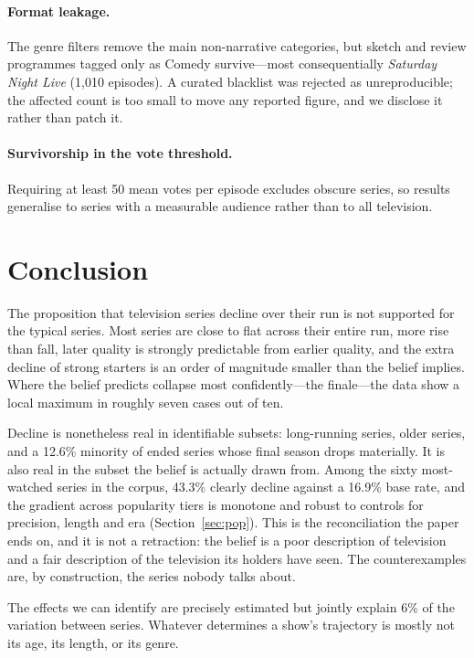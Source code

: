 \documentclass[11pt,a4paper]{article}
\begin{document}
\paragraph{Format leakage.}
The genre filters remove the main non-narrative categories, but sketch and
review programmes tagged only as Comedy survive---most consequentially
\emph{Saturday Night Live} (1,010 episodes). A curated blacklist was rejected
as unreproducible; the affected count is too small to move any reported figure,
and we disclose it rather than patch it.

\paragraph{Survivorship in the vote threshold.}
Requiring at least 50 mean votes per episode excludes obscure series, so
results generalise to series with a measurable audience rather than to all
television.

\FloatBarrier
\section{Conclusion}

The proposition that television series decline over their run is not supported
for the typical series. Most series are close to flat across their entire run,
more rise than fall, later quality is strongly predictable from earlier
quality, and the extra decline of strong starters is an order of magnitude
smaller than the belief implies. Where the belief predicts collapse most
confidently---the finale---the data show a local maximum in roughly seven cases
out of ten.

Decline is nonetheless real in identifiable subsets: long-running series, older
series, and a 12.6\% minority of ended series whose final season drops
materially. It is also real in the subset the belief is actually drawn from.
Among the sixty most-watched series in the corpus, 43.3\% clearly decline
against a 16.9\% base rate, and the gradient across popularity tiers is monotone
and robust to controls for precision, length and era
(Section~\ref{sec:pop}). This is the reconciliation the paper ends on, and it is
not a retraction: the belief is a poor description of television and a fair
description of the television its holders have seen. The counterexamples are, by
construction, the series nobody talks about.

The effects we can identify are precisely estimated but jointly explain 6\% of
the variation between series. Whatever determines a show's trajectory is mostly
not its age, its length, or its genre.
\end{document}
